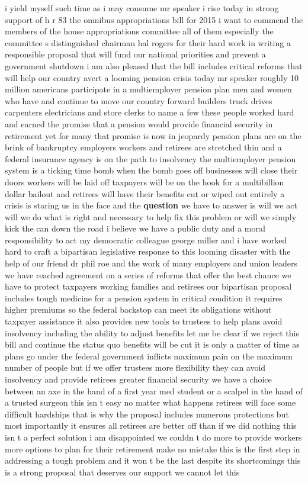 \documentclass{article}
\begin{document}
\vspace{8mm}
i yield myself such time as i may consume mr speaker i rise today in strong support of h r 83 the omnibus appropriations bill for 2015 i want to commend the members of the house appropriations committee all of them especially the committee s distinguished chairman hal rogers for their hard work in writing a responsible proposal that will fund our national priorities and prevent a government shutdown i am also pleased that the bill includes critical reforms that will help our country avert a looming pension crisis today mr speaker roughly 10 million americans participate in a multiemployer pension plan men and women who have and continue to move our country forward builders truck drives carpenters electricians and store clerks to name a few these people worked hard and earned the promise that a pension would provide financial security in retirement yet for many that promise is now in jeopardy pension plans are on the brink of bankruptcy employers workers and retirees are stretched thin and a federal insurance agency is on the path to insolvency the multiemployer pension system is a ticking time bomb when the bomb goes off businesses will close their doors workers will be laid off taxpayers will be on the hook for a multibillion dollar bailout and retirees will have their benefits cut or wiped out entirely a crisis is staring us in the face and the {\bf \color{red} question} we have to answer is will we act will we do what is right and necessary to help fix this problem or will we simply kick the can down the road i believe we have a public duty and a moral responsibility to act my democratic colleague george miller and i have worked hard to craft a bipartisan legislative response to this looming disaster with the help of our friend dr phil roe and the work of many employers and union leaders we have reached agreement on a series of reforms that offer the best chance we have to protect taxpayers working families and retirees our bipartisan proposal includes tough medicine for a pension system in critical condition it requires higher premiums so the federal backstop can meet its obligations without taxpayer assistance it also provides new tools to trustees to help plans avoid insolvency including the ability to adjust benefits let me be clear if we reject this bill and continue the status quo benefits will be cut it is only a matter of time as plans go under the federal government inflicts maximum pain on the maximum number of people but if we offer trustees more flexibility they can avoid insolvency and provide retirees greater financial security we have a choice between an axe in the hand of a first year med student or a scalpel in the hand of a trusted surgeon this isn t easy no matter what happens retirees will face some difficult hardships that is why the proposal includes numerous protections but most importantly it ensures all retirees are better off than if we did nothing this isn t a perfect solution i am disappointed we couldn t do more to provide workers more options to plan for their retirement make no mistake this is the first step in addressing a tough problem and it won t be the last despite its shortcomings this is a strong proposal that deserves our support we cannot let this 
\end{document}
